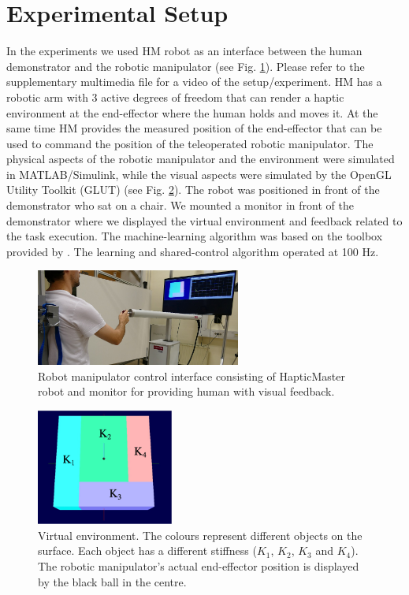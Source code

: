 \section{Experimental Setup}
In the experiments we used HM robot as an interface between the human demonstrator and the robotic manipulator (see Fig. \ref{fig:setup}). Please refer to the supplementary multimedia file for a video of the setup/experiment. HM has a robotic arm with 3 active degrees of freedom that can render a haptic environment at the end-effector where the human holds and moves it. At the same time HM provides the measured position of the end-effector that can be used to command the position of the teleoperated robotic manipulator. The physical aspects of the robotic manipulator and the environment were simulated in MATLAB/Simulink, while the visual aspects were simulated by the OpenGL Utility Toolkit (GLUT) (see Fig. \ref{fig:surface}). The robot was positioned in front of the demonstrator who sat on a chair. We mounted a monitor in front of the demonstrator where we displayed the virtual environment and feedback related to the task execution. The machine-learning algorithm was based on the toolbox provided by \cite{Klanke2008}. The learning and shared-control algorithm operated at 100 Hz.
\begin{figure}[!t]
  \centering
  \includegraphics[width=0.6\textwidth]{Luka/setup.jpg}
  \caption{Robot manipulator control interface consisting of HapticMaster robot and monitor for providing human with visual feedback.}
  \label{fig:setup}
  \vspace{-2 mm}
\end{figure}
\begin{figure}[!t]
  \centering
  \includegraphics[width=0.4\textwidth]{Luka/env.eps}
  \caption{Virtual environment. The colours represent different objects on the surface. Each object has a different stiffness ($K_1$, $K_2$, $K_3$ and $K_4$). The robotic manipulator's actual end-effector position is displayed by the black ball in the centre.}
  \label{fig:surface}
  \vspace{-4 mm}
\end{figure}

